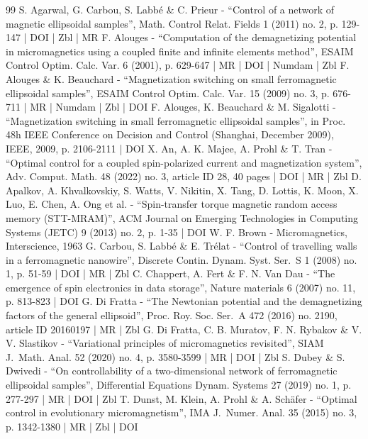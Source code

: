 \documentclass[10pt]{amsart}
\theoremstyle{definition}
\begin{document}
\begin{thebibliography}{99}
S. Agarwal, G. Carbou, S. Labbé \& C. Prieur - “Control of a network of magnetic ellipsoidal samples”, Math. Control Relat. Fields 1 (2011) no. 2, p. 129-147 | DOI | Zbl | MR
F. Alouges - “Computation of the demagnetizing potential in micromagnetics using a coupled finite and infinite elements method”, ESAIM Control Optim. Calc. Var. 6 (2001), p. 629-647 | MR | DOI | Numdam | Zbl
F. Alouges \& K. Beauchard - “Magnetization switching on small ferromagnetic ellipsoidal samples”, ESAIM Control Optim. Calc. Var. 15 (2009) no. 3, p. 676-711 | MR | Numdam | Zbl | DOI
F. Alouges, K. Beauchard \& M. Sigalotti - “Magnetization switching in small ferromagnetic ellipsoidal samples”, in Proc. 48h IEEE Conference on Decision and Control (Shanghai, December 2009), IEEE, 2009, p. 2106-2111 | DOI
X. An, A. K. Majee, A. Prohl \& T. Tran - “Optimal control for a coupled spin-polarized current and magnetization system”, Adv. Comput. Math. 48 (2022) no. 3, article ID 28, 40 pages | DOI | MR | Zbl
D. Apalkov, A. Khvalkovskiy, S. Watts, V. Nikitin, X. Tang, D. Lottis, K. Moon, X. Luo, E. Chen, A. Ong et al. - “Spin-transfer torque magnetic random access memory (STT-MRAM)”, ACM Journal on Emerging Technologies in Computing Systems (JETC) 9 (2013) no. 2, p. 1-35 | DOI
W. F. Brown - Micromagnetics, Interscience, 1963
G. Carbou, S. Labbé \& E. Trélat - “Control of travelling walls in a ferromagnetic nanowire”, Discrete Contin. Dynam. Syst. Ser. S 1 (2008) no. 1, p. 51-59 | DOI | MR | Zbl
C. Chappert, A. Fert \& F. N. Van Dau - “The emergence of spin electronics in data storage”, Nature materials 6 (2007) no. 11, p. 813-823 | DOI
G. Di Fratta - “The Newtonian potential and the demagnetizing factors of the general ellipsoid”, Proc. Roy. Soc. Ser. A 472 (2016) no. 2190, article ID 20160197 | MR | Zbl
G. Di Fratta, C. B. Muratov, F. N. Rybakov \& V. V. Slastikov - “Variational principles of micromagnetics revisited”, SIAM J. Math. Anal. 52 (2020) no. 4, p. 3580-3599 | MR | DOI | Zbl
S. Dubey \& S. Dwivedi - “On controllability of a two-dimensional network of ferromagnetic ellipsoidal samples”, Differential Equations Dynam. Systems 27 (2019) no. 1, p. 277-297 | MR | DOI | Zbl
T. Dunst, M. Klein, A. Prohl \& A. Schäfer - “Optimal control in evolutionary micromagnetism”, IMA J. Numer. Anal. 35 (2015) no. 3, p. 1342-1380 | MR | Zbl | DOI

\end{thebibliography}
\end{document}
